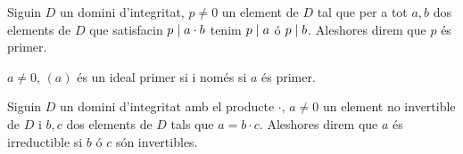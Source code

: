\documentclass[../Apunts.tex]{subfiles}
\begin{document}
	\begin{definition}[Primer]
		\label{def:primer en un anell}
		Siguin \(D\) un domini d'integritat, \(p\neq0\) un element de \(D\) tal que per a tot \(a,b\) dos elements de \(D\) que satisfacin \(p\mathrel{|} a\cdot b\) tenim \(p\mathrel{|} a\) ó \(p\mathrel{|} b\). Aleshores direm que \(p\) és primer.
	\end{definition}
	\begin{observation}
		\label{obs:ideals primer iff primer}
		\(a\neq0\), \((a)\) és un ideal primer si i només si \(a\) és primer.
	\end{observation}
	\begin{definition}
		\label{def:irreductible en un anell}
		Siguin \(D\) un domini d'integritat amb el producte \(\cdot\), \(a\neq0\) un element no invertible de \(D\) i \(b,c\) dos elements de \(D\) tals que \(a=b\cdot c\). Aleshores direm que \(a\) és irreductible si \(b\) ó \(c\) són invertibles.
	\end{definition}
\end{document}
